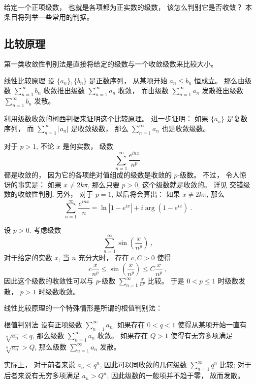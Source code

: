

给定一个正项级数， 也就是各项都为正实数的级数， 该怎么判别它是否收敛？ 本条目将列举一些常用的判据。

\subsection{比较原理}

第一类收敛性判别法是直接将给定的级数与一个收敛级数来比较大小。 

\begin{theorem}{线性比较原理}
设 $\{a_n\},\{b_n\}$ 是正数序列， 从某项开始 $a_n\leq b_n$ 恒成立。 那么由级数 $\sum_{n=1}^\infty b_n$ 收敛推出级数 $\sum_{n=1}^\infty a_n$ 收敛， 而由级数 $\sum_{n=1}^\infty a_n$ 发散推出级数 $\sum_{n=1}^\infty b_n$ 发散。
\end{theorem}
\begin{exercise}{}
利用级数收敛的柯西判据来证明这个比较原理。 进一步证明： 如果 $\{a_n\}$ 是复数序列， 而 $\sum_{n=1}^\infty|a_n|$ 是收敛级数， 那么 $\sum_{n=1}^\infty a_n$ 也是收敛级数。
\end{exercise}

\begin{example}{}
对于 $p>1$, 不论 $x$ 是何实数， 级数
$$
\sum_{n=1}^\infty\frac{e^{inx}}{n^p}~
$$
都是收敛的， 因为它的各项绝对值组成的级数是收敛的 $p$-级数。 不过， 令人惊讶的事实是： 如果 $x\neq 2k\pi$, 那么只要 $p>0$, 这个级数就是收敛的。 详见 交错级数的收敛性判别. 另外， 对于 $p=1$, 以后将会算出： 如果 $x\neq 2k\pi$, 那么
$$
\sum_{n=1}^\infty\frac{e^{inx}}{n}=\ln|1-e^{ix}|+i\arg(1-e^{ix})~.
$$
\end{example}

\begin{example}{}
设 $p>0$. 考虑级数
$$
\sum_{n=1}^\infty\sin\left(\frac{x}{n^p}\right)~,
$$
对于给定的实数 $x$, 当 $n$ 充分大时， 存在 $c,C>0$ 使得
$$
c\frac{x}{n^p}\leq\sin\left(\frac{x}{n^p}\right)\leq C\frac{x}{n^p}~,
$$
因此这个级数的收敛性可以与 $p$-级数 $\sum_{n=1}^\infty\frac{x}{n^p}$ 比较。 于是 $0<p\leq1$ 时级数发散， $p>1$ 时级数收敛。
\end{example}

线性比较原理的一个特殊情形是所谓的根值判别法：

\begin{theorem}{根值判别法}
设有正项级数 $\sum_{n=1}^\infty a_n$. 如果存在 $0<q<1$ 使得从某项开始一直有 $\sqrt[n]{a_n}<q$, 那么级数 $\sum_{n=1}^\infty a_n$ 收敛。 如果存在 $Q>1$ 使得有无穷多项满足 $\sqrt[n]{a_n}>Q$, 那么级数 $\sum_{n=1}^\infty a_n$ 发散。
\end{theorem}
实际上， 对于前者来说 $a_n<q^n$, 因此可以同收敛的几何级数 $\sum_{n=1}^\infty q^n$ 比较; 对于后者来说有无穷多项满足 $a_n>Q^n$, 因此级数的一般项并不趋于零， 故而发散。

